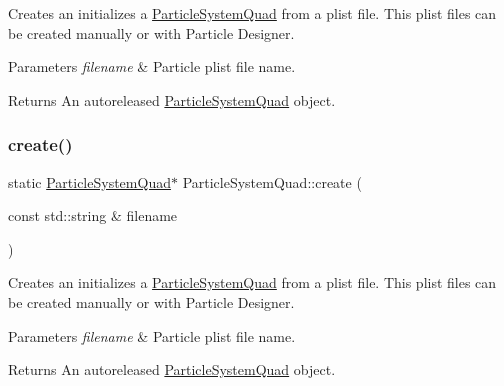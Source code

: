 Creates an initializes a \hyperlink{classParticleSystemQuad}{Particle\+System\+Quad} from a plist file. This plist files can be created manually or with Particle Designer.


\begin{DoxyParams}{Parameters}
{\em filename} & Particle plist file name. \\
\hline
\end{DoxyParams}
\begin{DoxyReturn}{Returns}
An autoreleased \hyperlink{classParticleSystemQuad}{Particle\+System\+Quad} object. 
\end{DoxyReturn}
\mbox{\label{classParticleSystemQuad_aaa6f2d6b8468ae6f7d19a1f93ce73da4}} 
\subsubsection{\texorpdfstring{create()}{create()}\hspace{0.1cm}{\footnotesize\ttfamily [4/6]}}
{\footnotesize\ttfamily static \hyperlink{classParticleSystemQuad}{Particle\+System\+Quad}$\ast$ Particle\+System\+Quad\+::create (\begin{DoxyParamCaption}\item[{const std\+::string \&}]{filename }\end{DoxyParamCaption})\hspace{0.3cm}{\ttfamily [static]}}

Creates an initializes a \hyperlink{classParticleSystemQuad}{Particle\+System\+Quad} from a plist file. This plist files can be created manually or with Particle Designer.


\begin{DoxyParams}{Parameters}
{\em filename} & Particle plist file name. \\
\hline
\end{DoxyParams}
\begin{DoxyReturn}{Returns}
An autoreleased \hyperlink{classParticleSystemQuad}{Particle\+System\+Quad} object. 
\end{DoxyReturn}
\mbox{\label{classParticleSystemQuad_a65fc2d6e119c8d2693affe6e50727cf1}} 
